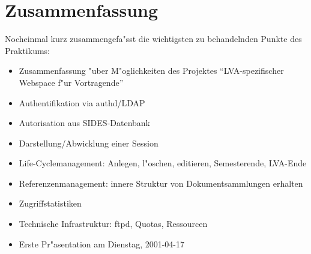 \documentclass[12pt,a4paper]{article}
\begin{document}
\section{Zusammenfassung}

Nocheinmal kurz zusammengefa"sst die wichtigsten zu behandelnden Punkte des
Praktikums:
\begin{itemize}
\item{Zusammenfassung "uber M"oglichkeiten des Projektes 
	"`LVA-spezifischer Webspace f"ur Vortragende"'}
\item{Authentifikation via authd/LDAP}
\item{Autorisation aus SIDES-Datenbank}
\item{Darstellung/Abwicklung einer Session}
\item{Life-Cyclemanagement: Anlegen, l"oschen, editieren, Semesterende,
	LVA-Ende}
\item{Referenzenmanagement: innere Struktur von Dokumentsammlungen
	erhalten}
\item{Zugriffstatistiken}
\item{Technische Infrastruktur: ftpd, Quotas, Ressourcen}
\item{Erste Pr"asentation am Dienstag, 2001-04-17}
\end{itemize}
\end{document}
